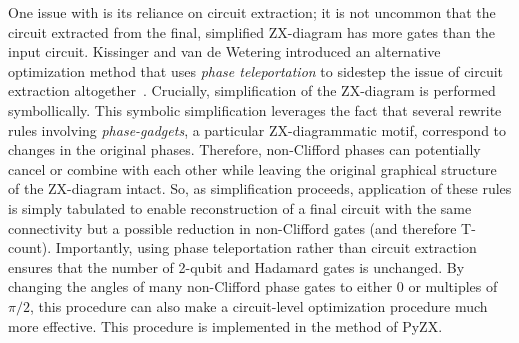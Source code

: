 One issue with  is its reliance on circuit extraction; it is not uncommon that the circuit extracted from the final, simplified ZX-diagram has more gates than the input circuit.
Kissinger and van de Wetering introduced an alternative optimization method that uses \emph{phase teleportation} to sidestep the issue of circuit extraction altogether~\cite{kissinger2019reducing}.
Crucially, simplification of the ZX-diagram is performed symbollically.
This symbolic simplification leverages the fact that several rewrite rules involving \emph{phase-gadgets}, a particular ZX-diagrammatic motif, correspond to changes in the original phases.
Therefore, non-Clifford phases can potentially cancel or combine with each other while leaving the original graphical structure of the ZX-diagram intact.
So, as simplification proceeds, application of these rules is simply tabulated to enable reconstruction of a final circuit with the same connectivity but a possible reduction in non-Clifford gates (and therefore T-count).
Importantly, using phase teleportation rather than circuit extraction ensures that the number of 2-qubit and Hadamard gates is unchanged. %
By changing the angles of many non-Clifford phase gates to either 0 or multiples of $\pi /2$, this procedure can also make a circuit-level optimization procedure much more effective.
This procedure is implemented in the  method of PyZX.

